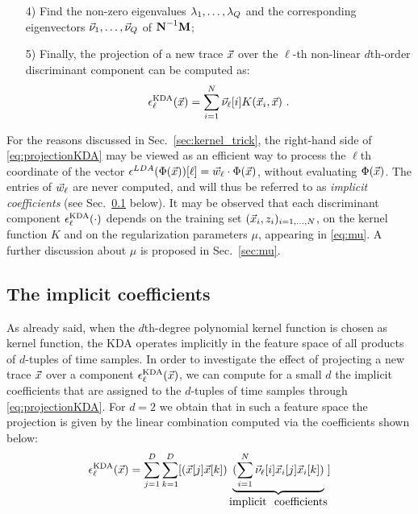 \begin{itemize}
\item[4)]\label{point:eigs} Find the non-zero eigenvalues $\lambda_1, \dots, \lambda_Q$ and the corresponding eigenvectors $\vec{\nu}_1, \dots, \vec{\nu}_Q$ of $\textbf{N}^{-1}\textbf{M}$; 


\item[5)] Finally, the projection of a new trace $\vec{x}$ over the $\ell$-th non-linear $d$th-order discriminant component can be computed as:
\begin{equation}\label{eq:projectionKDA}
\epsilon^{\mathrm{KDA}}_{\ell}(\vec{x}) = \sum_{i=1}^{N}{\vec{\nu}}_\ell[i]K(\vec{x}_i, \vec{x}) \mbox{ .}
\end{equation} 

\end{itemize}
For the reasons discussed in Sec.~\ref{sec:kernel_trick}, the right-hand side of \eqref{eq:projectionKDA} may be viewed as an efficient way to process the $\ell$th coordinate of the vector $\epsilon^{LDA}(\Phi(\vec{x}))[\ell] = \vec{w}_{\ell} \cdot \Phi(\vec{x})$,
without evaluating $\Phi(\vec{x})$. The entries of $\vec{w}_{\ell}$ are never computed, and will thus be referred to as \emph{implicit coefficients} (see Sec.~\ref{sec:implicit} below). It may be observed that each discriminant component $\epsilon^{\mathrm{KDA}}_{\ell}(\cdot)$ depends on the training set $(\vec{x}_i, z_i)_{i=1, \dots , N}$, on the kernel function $K$ and on the regularization parameters $\mu$, appearing in \eqref{eq:mu}. A further discussion about $\mu$ is proposed in Sec.~\ref{sec:mu}.

\subsection{The implicit coefficients}\label{sec:implicit}
As already said, when the $d$th-degree  polynomial kernel function is chosen as kernel function, the KDA operates implicitly in the feature space of all products of $d$-tuples of time samples. In order to investigate the effect of projecting a new trace $\vec{x}$ over a component $\epsilon^{\mathrm{KDA}}_{\ell}(\vec{x})$, we can compute for a small $d$ the implicit coefficients that are assigned to the $d$-tuples of time samples through \eqref{eq:projectionKDA}. For $d=2$ we obtain that in such a feature space the projection is given by the linear combination computed via the coefficients shown below: 
\begin{equation}\label{eq:implicit}
\extract^{\mathrm{KDA}}_{\ell}(\vLeakVec) = \sum_{j=1}^\traceLength \sum_{k=1}^\traceLength[ (\vLeakVec[j]\vLeakVec[k])\underbrace{(\sum_{i=1}^{\nbTraces}\nununu_{\ell}[i] \vLeakVec_i[j]\vLeakVec_{i}[k])}_{\mbox{implicit \ coefficients}}]
\end{equation}




